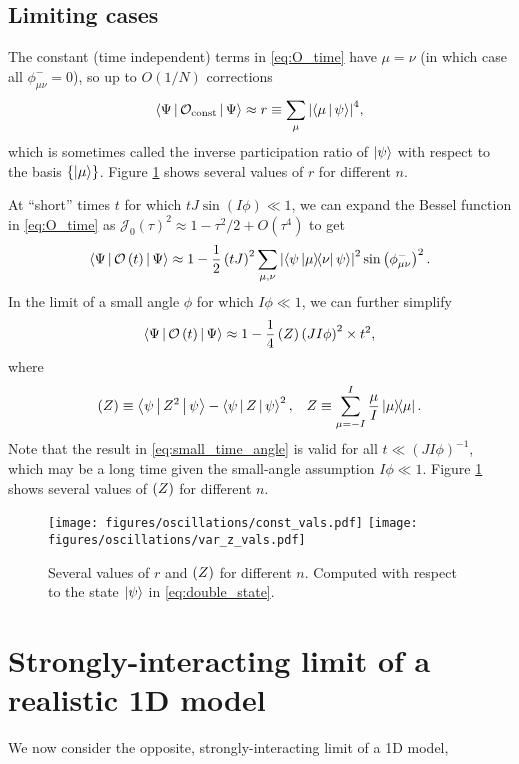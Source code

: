 \documentclass[nofootinbib,notitlepage,11pt]{revtex4-2}
\renewcommand{\t}{\text} %
\newcommand{\f}[2]{\dfrac{#1}{#2}} %
\newcommand{\p}[1]{\left(#1\right)} %
\renewcommand{\set}[1]{\left\{#1\right\}} %
\newcommand{\bk}{\Braket} %
\newcommand{\1}{\mathds{1}}
\newcommand{\J}{\mathcal{J}}
\renewcommand{\O}{\mathcal{O}}
\let\var\relax
\DeclareMathOperator{\var}{var}
\begin{document}
\subsection{Limiting cases}

The constant (time independent) terms in \eqref{eq:O_time} have
$\mu=\nu$ (in which case all $\phi_{\mu\nu}^-=0$), so up to $O(1/N)$
corrections
\begin{align}
  \bk{\Psi|\O_{\t{const}}|\Psi}
  \approx r \equiv \sum_\mu \abs{\bk{\mu|\psi}}^4,
  \label{eq:O_const}
\end{align}
which is sometimes called the inverse participation ratio of
$\ket\psi$ with respect to the basis $\set{\ket\mu}$.  Figure
\ref{fig:limiting_vals} shows several values of $r$ for different $n$.

At ``short'' times $t$ for which $tJ\sin\p{I\phi}\ll1$, we can expand
the Bessel function in \eqref{eq:O_time} as
$\J_0\p{\tau}^2\approx1-\tau^2/2+O\p{\tau^4}$ to get
\begin{align}
  \bk{\Psi|\O\p{t}|\Psi}
  \approx 1 - \f12 \p{tJ}^2 \sum_{\mu,\nu}
  \abs{\bk{\psi\op{\mu}{\nu}\psi}}^2 \sin\p{\phi_{\mu\nu}^-}^2.
\end{align}
In the limit of a small angle $\phi$ for which $I\phi\ll1$, we can
further simplify
\begin{align}
  \bk{\Psi|\O\p{t}|\Psi}
  \approx 1 - \f14 \var\p{Z} \p{JI\phi}^2 \times t^2,
  \label{eq:small_time_angle}
\end{align}
where
\begin{align}
  \var\p{Z}
  \equiv \bk{\psi|Z^2|\psi} - \bk{\psi|Z|\psi}^2,
  &&
  Z \equiv \sum_{\mu=-I}^I \f{\mu}{I} \op{\mu}.
\end{align}
Note that the result in \eqref{eq:small_time_angle} is valid for all
$t\ll\p{JI\phi}^{-1}$, which may be a long time given the small-angle
assumption $I\phi\ll1$.  Figure \ref{fig:limiting_vals} shows several
values of $\var\p{Z}$ for different $n$.

\begin{figure}
  \centering
  \texttt{[image: figures/oscillations/const\_vals.pdf]}
  \texttt{[image: figures/oscillations/var\_z\_vals.pdf]}
  \caption{Several values of $r$ and $\var\p{Z}$ for different $n$.
    Computed with respect to the state $\ket\psi$ in
    \eqref{eq:double_state}.}
  \label{fig:limiting_vals}
\end{figure}

\section{Strongly-interacting limit of a realistic 1D model}

We now consider the opposite, strongly-interacting limit of a 1D
model,
\end{document}
